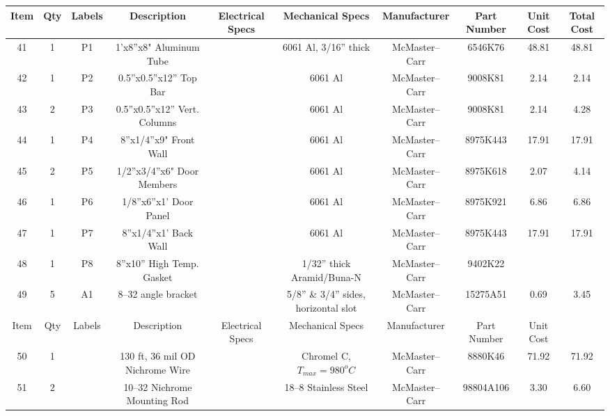 \documentclass[10pt, twocolumn]{article}
\begin{document}
\begin{center}
\begin{adjustbox}{max width=\textwidth}
\begin{tabular}{c c c c c c c c c c}
\hline\hline
Item	&Qty	&Labels	&Description		&Electrical Specs		&Mechanical Specs
	&Manufacturer		&Part Number		&Unit Cost	&Total Cost	\\
\hline

41	&1	&P1	&1'x8”x8" Aluminum Tube		&	&6061 Al, 3/16” thick
	&McMaster--Carr	&6546K76			&48.81		&48.81	\\

42	&1	&P2	&0.5”x0.5”x12” Top Bar		&	&6061 Al
	&McMaster--Carr	&9008K81			&2.14		&2.14	\\

43	&2	&P3	&0.5”x0.5”x12” Vert. Columns	&	&6061 Al
	&McMaster--Carr	&9008K81			&2.14		&4.28	\\

44	&1	&P4	&8”x1/4”x9" Front Wall		&	&6061 Al
	&McMaster--Carr	&8975K443			&17.91		&17.91	\\

45	&2	&P5	&1/2”x3/4”x6" Door Members	&	&6061 Al
	&McMaster--Carr	&8975K618			&2.07		&4.14	\\

46	&1	&P6	&1/8”x6”x1' Door Panel		&	&6061 Al
	&McMaster--Carr	&8975K921			&6.86		&6.86	\\

47	&1	&P7	&8”x1/4”x1' Back Wall		&	&6061 Al
	&McMaster--Carr	&8975K443			&17.91		&17.91	\\

48	&1	&P8	&8”x10” High Temp. Gasket	&	&1/32” thick Aramid/Buna-N
	&McMaster--Carr	&9402K22		&		&	\\

49	&5	&A1	&8--32 angle bracket		&	&5/8” \& 3/4” sides, horizontal slot
	&McMaster--Carr	&15275A51		&0.69	&3.45	\\

\hline
Item	&Qty	&Labels	&Description	&Electrical Specs	&Mechanical Specs
	&Manufacturer		&Part Number		&Unit Cost	&	\\
\hline

50	&1	&	&130 ft, 36 mil OD Nichrome Wire	&	&Chromel C, $T_{max}=980^{o}C$
	&McMaster--Carr	&8880K46		&71.92	&71.92	\\

51	&2	&	&10--32 Nichrome Mounting Rod		&	&18--8 Stainless Steel
	&McMaster--Carr	&98804A106		&3.30	&6.60	\\


\end{tabular}
\end{adjustbox}
\end{center}
\end{document}
